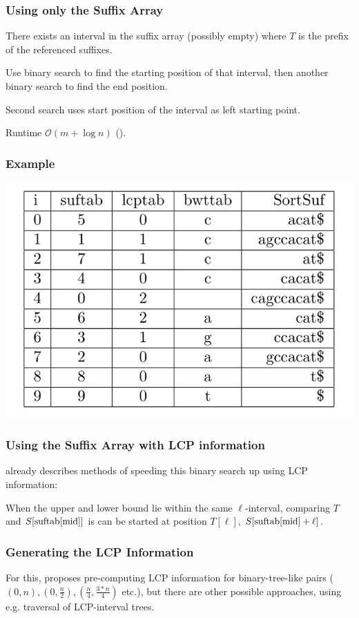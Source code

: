 \documentclass[compress,handout]{beamer} %
\renewcommand{\O}{\mathcal{O}}
\begin{document}
\begin{frame}
	\frametitle{Using only the Suffix Array}
	There exists an interval in the suffix array (possibly empty)
	where $T$ is the prefix of the referenced suffixes.

	Use binary search to find the starting position of that interval,
	then another binary search to find the end position.

	Second search uses start position of the interval as left
	starting point.

	Runtime $\O(m + \log n)$ (\cite{manber1993suffix}).
\end{frame}

\begin{frame}
	\frametitle{Example}
	\includegraphics[width=\textwidth, height=\textheight, keepaspectratio=true]{esa_with_bwttab_example}
\end{frame}

\begin{frame}
	\frametitle{Using the Suffix Array with LCP information}
	\cite{manber1993suffix} already describes methods of speeding
	this binary search up using LCP information:

	When the upper and lower bound lie within
	the same $\ell$-interval, comparing $T$ and
	$S[\hbox{suftab}[\hbox{mid}]]$ is can be started at position
	$T[\ell]$, $S[\hbox{suftab}[\hbox{mid}]+\ell]$.
\end{frame}

\begin{frame}
	\frametitle{Generating the LCP Information}
	For this, \cite{manber1993suffix} proposes pre-computing LCP
	information for binary-tree-like pairs
	($(0,n), (0,\frac{n}{2}), (\frac{n}{4}, \frac{3*n}{4})$ etc.),
	but there are other possible approaches, using e.g. traversal
	of LCP-interval trees.
\end{frame}
\end{document}
